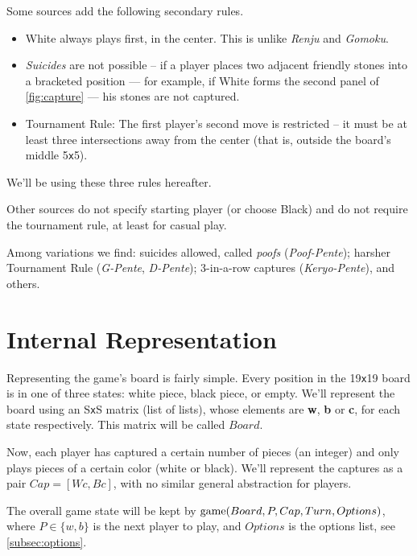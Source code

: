 \documentclass[12pt,a4paper,notitlepage]{article}
\newcommand*{\boardsize}[1]{#1\texttt{x}#1}
\begin{document}
Some sources add the following secondary rules.

\begin{itemize}
	\item White always plays first, in the center.\supercite{pente-renjunu, pente-wikipedia} This is unlike \textit{Renju} and \textit{Gomoku}.
	\item \textsl{Suicides} are not possible -- if a player places two adjacent friendly stones into a bracketed position --- for example, if White forms the second panel of \autoref{fig:capture} --- his stones are not captured.\supercite{pente-renjunu,pente-org,pente-wikipedia,pente-winning-moves}
	\item Tournament Rule: The first player's second move is restricted -- it must be at least three intersections away from the center (that is, outside the board's middle \boardsize{5}).\supercite{pente-net,pente-org,pente-wikipedia,pente-winning-moves}
\end{itemize}

We'll be using these three rules hereafter.

Other sources do not specify starting player (or choose Black) and do not require the tournament rule, at least for casual play. 

Among variations we find: suicides allowed, called \textit{poofs} (\textit{Poof-Pente}); harsher Tournament Rule (\textit{G-Pente}, \textit{D-Pente}); 3-in-a-row captures (\textit{Keryo-Pente}), and others.\supercite{pente-org,pente-net}

\section{Internal Representation}
\label{sec:internal}

Representing the game's board is fairly simple.
Every position in the \boardsize{19} board is in one of three states:
white piece, black piece, or empty. We'll represent the board using
an \boardsize{S} matrix (list of lists), whose elements are \textbf{w},
\textbf{b} or \textbf{c}, for each state respectively.
This matrix will be called $Board$.

Now, each player has captured a certain number of pieces (an integer) and only plays pieces of a certain color (white or black). We'll represent the captures as a pair $Cap=[Wc,Bc]$, with no similar general abstraction for players.

The overall game state will be kept by $\textup{game}(Board, P, Cap, Turn, Options)$, where $P\in\{w,b\}$ is the next player to play, and $Options$ is the options list, see \autoref{subsec:options}.
\end{document}
